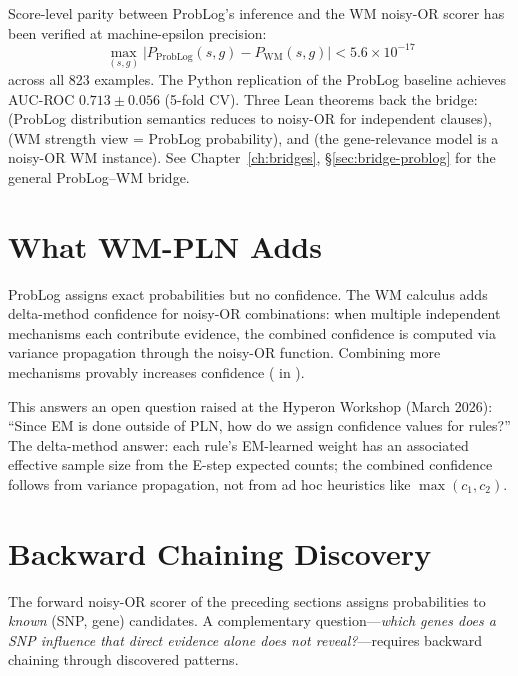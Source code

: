 \documentclass[11pt,openany]{report}
\begin{document}
Score-level parity between ProbLog's 
inference and the WM noisy-OR scorer has been verified at
machine-epsilon precision:
\[
  \max_{(s, g)} \bigl| P_{\mathrm{ProbLog}}(s, g) -
    P_{\mathrm{WM}}(s, g) \bigr| < 5.6 \times 10^{-17}
\]
across all 823 examples.  The Python replication of the ProbLog
baseline achieves AUC-ROC $0.713 \pm 0.056$ (5-fold CV).  Three Lean theorems back the bridge:
 (ProbLog distribution semantics
reduces to noisy-OR for independent clauses),
 (WM strength view =
ProbLog probability), and
 (the gene-relevance model
is a noisy-OR WM instance).
See Chapter~\ref{ch:bridges}, \S\ref{sec:bridge-problog} for the
general ProbLog--WM bridge.


\section{What WM-PLN Adds}

ProbLog assigns exact probabilities but no confidence.  The WM
calculus adds delta-method confidence for noisy-OR combinations:
when multiple independent mechanisms each contribute evidence,
the combined confidence is computed via variance propagation
through the noisy-OR function.  Combining more mechanisms
provably increases confidence
( in
).

This answers an open question raised at the Hyperon Workshop
(March 2026): ``Since EM is done outside of PLN, how do we
assign confidence values for rules?''  The delta-method answer:
each rule's EM-learned weight has an associated effective sample
size from the E-step expected counts; the combined confidence
follows from variance propagation, not from ad hoc heuristics
like $\max(c_1, c_2)$.


\section{Backward Chaining Discovery}
\label{sec:bio-bc}

The forward noisy-OR scorer of the preceding sections assigns
probabilities to \emph{known} (SNP, gene) candidates.  A complementary
question---\emph{which genes does a SNP influence that direct evidence
  alone does not reveal?}---requires backward chaining through
discovered patterns.
\end{document}
